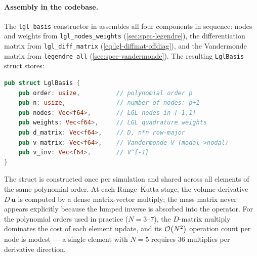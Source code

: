 \paragraph{Assembly in the codebase.}

The \texttt{lgl\_basis} constructor in  assembles all
four components in sequence: nodes and weights from
\texttt{lgl\_nodes\_weights} (\cref{sec:spec-legendre}), the
differentiation matrix from \texttt{lgl\_diff\_matrix}
(\cref{eq:lgl-diffmat-offdiag}), and the Vandermonde matrix from
\texttt{legendre\_all} (\cref{sec:spec-vandermonde}).  The resulting
\texttt{LglBasis} struct stores:
%
\begin{lstlisting}[language=Rust]
pub struct LglBasis {
    pub order: usize,          // polynomial order p
    pub n: usize,              // number of nodes: p+1
    pub nodes: Vec<f64>,       // LGL nodes in [-1,1]
    pub weights: Vec<f64>,     // LGL quadrature weights
    pub d_matrix: Vec<f64>,    // D, n*n row-major
    pub v_matrix: Vec<f64>,    // Vandermonde V (modal->nodal)
    pub v_inv: Vec<f64>,       // V^{-1}
}
\end{lstlisting}
%
The struct is constructed once per simulation and shared across all
elements of the same polynomial order.  At each Runge--Kutta stage,
the volume derivative $D\,\mathbf{u}$ is computed by a dense
matrix-vector multiply; the mass matrix never appears explicitly
because the lumped inverse is absorbed into the operator.  For the
polynomial orders used in practice ($N = 3$--$7$), the $D$-matrix
multiply dominates the cost of each element update, and its
$\mathcal{O}\!\left(N^2\right)$ operation count per node is modest --- a single
element with $N = 5$ requires $36$ multiplies per derivative
direction.
